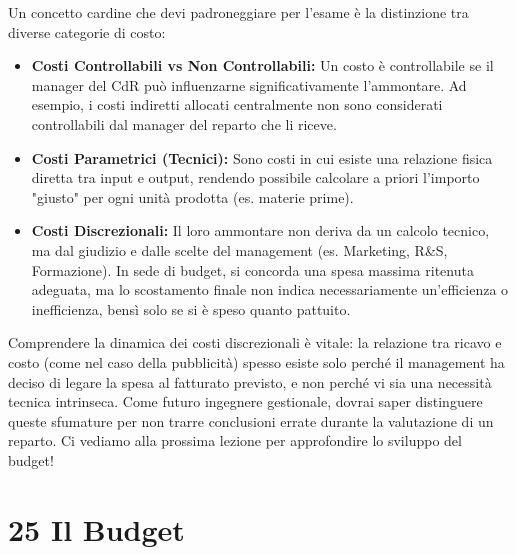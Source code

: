 \documentclass[a4paper,10pt]{article}
\begin{document}
Un concetto cardine che devi padroneggiare per l'esame è la distinzione tra diverse categorie di costo:

\begin{itemize}
    \item \textbf{Costi Controllabili vs Non Controllabili:} Un costo è controllabile se il manager del CdR può influenzarne significativamente l'ammontare. Ad esempio, i costi indiretti allocati centralmente non sono considerati controllabili dal manager del reparto che li riceve.
    \item \textbf{Costi Parametrici (Tecnici):} Sono costi in cui esiste una relazione fisica diretta tra input e output, rendendo possibile calcolare a priori l'importo "giusto" per ogni unità prodotta (es. materie prime).
    \item \textbf{Costi Discrezionali:} Il loro ammontare non deriva da un calcolo tecnico, ma dal giudizio e dalle scelte del management (es. Marketing, R\&S, Formazione). In sede di budget, si concorda una spesa massima ritenuta adeguata, ma lo scostamento finale non indica necessariamente un'efficienza o inefficienza, bensì solo se si è speso quanto pattuito.
\end{itemize}

Comprendere la dinamica dei costi discrezionali è vitale: la relazione tra ricavo e costo (come nel caso della pubblicità) spesso esiste solo perché il management ha deciso di legare la spesa al fatturato previsto, e non perché vi sia una necessità tecnica intrinseca. Come futuro ingegnere gestionale, dovrai saper distinguere queste sfumature per non trarre conclusioni errate durante la valutazione di un reparto. Ci vediamo alla prossima lezione per approfondire lo sviluppo del budget!

\section*{25 Il Budget}
\end{document}
